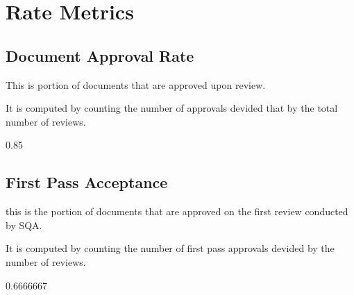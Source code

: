 \documentclass{article}
\begin{document}
\section{Rate Metrics}
\subsection{Document Approval Rate}
This is portion of documents that are approved upon review.

It is computed by counting the number of approvals devided that by the total number of reviews.

\begin{Schunk}
\begin{Soutput}
[1] 0.85
\end{Soutput}
\end{Schunk}

\subsection{First Pass Acceptance}
this is the portion of documents that are approved on the first review conducted
by SQA.

It is computed by counting the number of first pass approvals devided by
the number of reviews.

\begin{Schunk}
\begin{Soutput}
[1] 0.6666667
\end{Soutput}
\end{Schunk}
\end{document}
